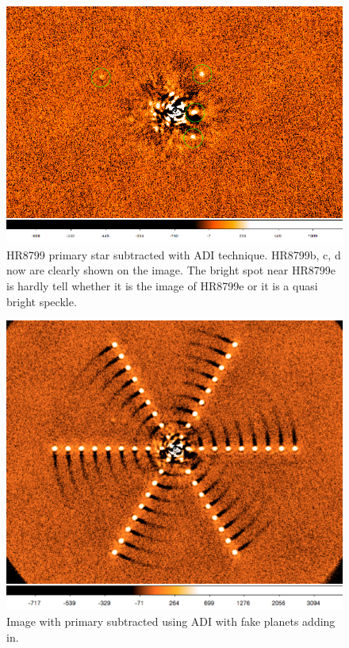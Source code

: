 \documentclass[paper=letter, fontsize=11pt]{scrartcl} %
\numberwithin{equation}{section} %
\numberwithin{figure}{section} %
\numberwithin{table}{section} %
\begin{document}
\begin{figure}[!h]
  \centering
  \includegraphics[width=\textwidth]{simple_ADI}
  \caption{HR8799 primary star subtracted with ADI technique. HR8799b,
    c, d now are clearly shown on the image. The bright spot near
    HR8799e is hardly tell whether it is the image of HR8799e or it is
    a quasi bright speckle.}
  \label{fig:simple_adi}
\end{figure}

   \begin{figure}
    \centering
    \includegraphics[width=\textwidth]{adi_fake}
    \caption{Image with primary subtracted using ADI with fake planets adding
      in.}
    \label{fig:adi_fakeplanet}
  \end{figure}
\end{document}
